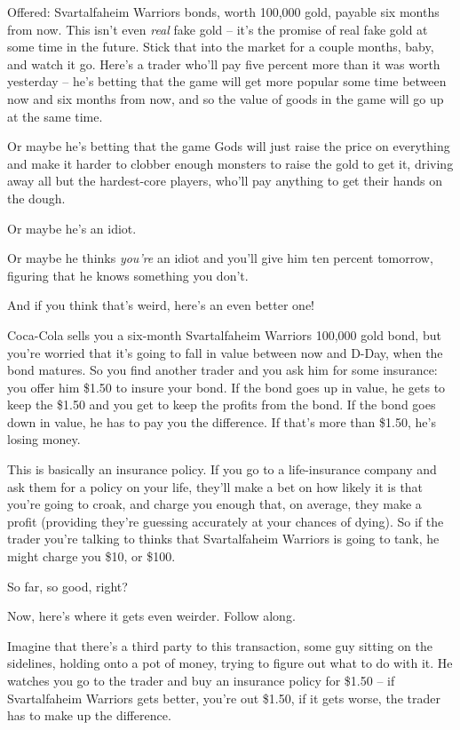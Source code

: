 Offered: Svartalfaheim Warriors bonds, worth 100,000 gold, payable
six months from now. This isn't even \emph{real} fake gold -- it's
the promise of real fake gold at some time in the future. Stick
that into the market for a couple months, baby, and watch it go.
Here's a trader who'll pay five percent more than it was worth
yesterday -- he's betting that the game will get more popular some
time between now and six months from now, and so the value of goods
in the game will go up at the same time.

Or maybe he's betting that the game Gods will just raise the price
on everything and make it harder to clobber enough monsters to
raise the gold to get it, driving away all but the hardest-core
players, who'll pay anything to get their hands on the dough.

Or maybe he's an idiot.

Or maybe he thinks \emph{you're} an idiot and you'll give him ten
percent tomorrow, figuring that he knows something you don't.

And if you think that's weird, here's an even better one!

Coca-Cola sells you a six-month Svartalfaheim Warriors 100,000 gold
bond, but you're worried that it's going to fall in value between
now and D-Day, when the bond matures. So you find another trader
and you ask him for some insurance: you offer him \$1.50 to insure
your bond. If the bond goes up in value, he gets to keep the \$1.50
and you get to keep the profits from the bond. If the bond goes
down in value, he has to pay you the difference. If that's more
than \$1.50, he's losing money.

This is basically an insurance policy. If you go to a
life-insurance company and ask them for a policy on your life,
they'll make a bet on how likely it is that you're going to croak,
and charge you enough that, on average, they make a profit
(providing they're guessing accurately at your chances of dying).
So if the trader you're talking to thinks that Svartalfaheim
Warriors is going to tank, he might charge you \$10, or \$100.

So far, so good, right?

Now, here's where it gets even weirder. Follow along.

Imagine that there's a third party to this transaction, some guy
sitting on the sidelines, holding onto a pot of money, trying to
figure out what to do with it. He watches you go to the trader and
buy an insurance policy for \$1.50 -- if Svartalfaheim Warriors
gets better, you're out \$1.50, if it gets worse, the trader has to
make up the difference.

